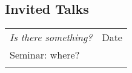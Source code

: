 \documentclass[letterpaper]{article}
\begin{document}
\subsection*{Invited Talks}
\vspace{-10pt}
\begin{longtable}{lr}%
{\em\large Is there something?}& Date\\
{\small Seminar: where?} \\
\\
\end{longtable}
\end{document}

